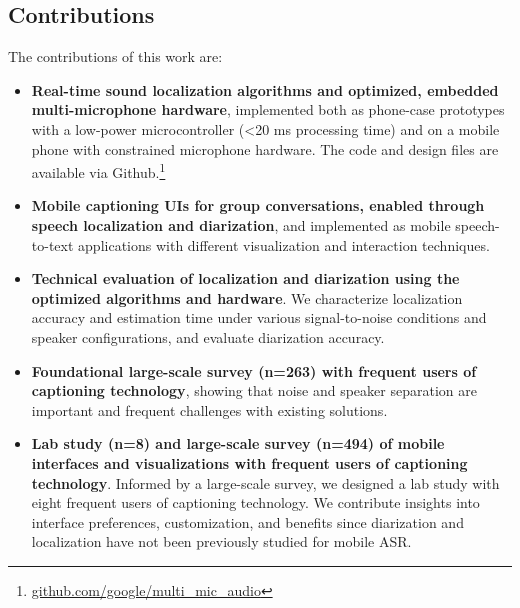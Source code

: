 \subsection{Contributions}
The contributions of this work are: 
\begin{itemize}
    \item \textbf{Real-time sound localization algorithms and optimized, embedded multi-microphone hardware}, implemented both as phone-case prototypes with a low-power microcontroller (<20 ms processing time) and on a mobile phone with constrained microphone hardware. The code and design files are available via Github.\footnote{\href{https://github.com/google/multi_mic_audio}{github.com/google/multi\_mic\_audio}}
    
     \item \textbf{Mobile captioning UIs for group conversations, enabled through speech localization and diarization}, and implemented as mobile speech-to-text applications with different visualization and interaction techniques.
        
    \item \textbf{Technical evaluation of localization and diarization using the optimized algorithms and hardware}. We characterize localization accuracy and estimation time under various signal-to-noise conditions and speaker configurations, and evaluate diarization accuracy.

    \item \textbf{Foundational large-scale survey (n=263) with frequent users of captioning technology}, showing that noise and speaker separation are important and frequent challenges with existing solutions.

    \item \textbf{Lab study (n=8) and large-scale survey (n=494) of mobile interfaces and visualizations with frequent users of captioning technology}. Informed by a large-scale survey, we designed a lab study with eight frequent users of captioning technology. We contribute insights into interface preferences, customization, and benefits since diarization and localization have not been previously studied for mobile ASR.
    
\end{itemize}

